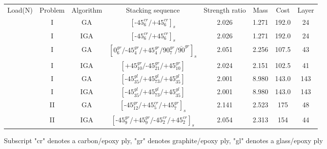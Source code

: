 \documentclass[Afour,sageh,times]{sagej}
\begin{document}
\begin{figure}
\begin{center}
\begin{tabular}{cccccccc}
	\toprule
	Load(N)                                                 &  Problem  &   Algorithm      & Stacking sequence                                    & Strength ratio  & Mass  &  Cost   & Layer    \\ 
	     &       I   &  GA   &  $[\text{-}45_{6}^{cr}/\text{+}45_{6}^{cr}]_s$                        & 2.026           & 1.271 &  192.0  & 24  \\
	                                                        &       I   &  IGA   &  $[\text{-}45_{6}^{cr}/\text{+}45_{6}^{cr}]_s$                        & 2.026           & 1.271 &  192.0  & 24  \\
															&       I   &  GA    &  $[0_6^{gr}/\text{-}45_{4}^{gr}/\text{+}45_{4}^{gr}/90_{7}^{gr}/\bar{90}^{gr}]_s$     & 2.051           & 2.256 &  107.5  & 43  \\
															&       I   &  IGA    &  $[\text{+}45_{10}^{gr}/\text{-}45_{21}^{gr}/\text{+}45_{10}^{gr}]$    & 2.024           & 2.151 &  102.5  & 41  \\
															&       I   &  GA    &  $[\text{-}45_{35}^{gl}/\text{+}45_{73}^{gl}/\text{+}45_{35}^{gl}]$    & 2.001           & 8.980 &  143.0  & 143  \\
															&       I   &  IGA    &  $[\text{-}45_{35}^{gl}/\text{+}45_{73}^{gl}/\text{+}45_{35}^{gl}]$    & 2.001           & 8.980 &  143.0  & 143  \\
															&       II  &  GA    &
	$[\text{-}45_{12}^{gr}/\text{+}45_{5}^{cr}/\text{+}45_{7}^{gr}]_s$         & 2.141
										  & 2.523 & 175& 48  \\
															&       II  &  IGA    &
	$[\text{-}45_{9}^{gr}/\text{+}45_{9}^{gr}/\text{-}45_{2}^{cr}/\text{+}45_{2}^{cr}]_s$         & 2.054
										  & 2.313 & 154& 44  \\
	\bottomrule
\end{tabular}
\label{tab:NxNy}
\begin{tablenotes}\footnotesize
     Subscript "cr" denotes a carbon/epoxy ply, "gr" denotes graphite/epoxy ply, "gl" denotes a
	glass/epoxy ply
\end{tablenotes}
\end{center}
\end{figure}
\end{document}
